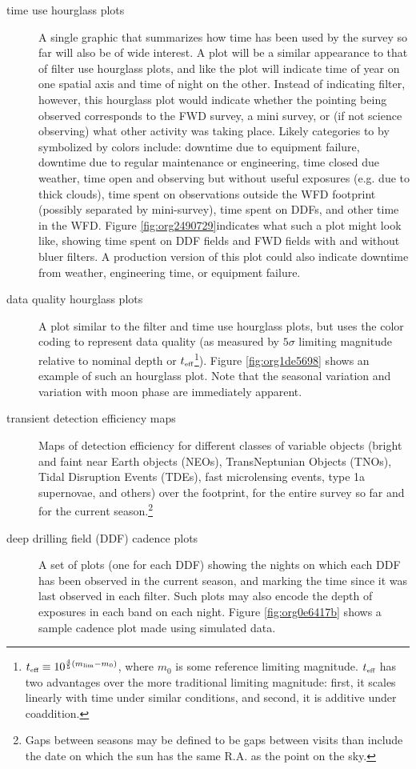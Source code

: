 \begin{description}
\item[{time use hourglass plots}] A single graphic that summarizes how time has been used by the survey so far will also be of wide interest. A plot will be a similar appearance to that of filter use hourglass plots, and like the plot will indicate time of year on one spatial axis and time of night on the other. Instead of indicating filter, however, this hourglass plot would indicate whether the pointing being observed corresponds to the FWD survey, a mini survey, or (if not science observing) what other activity was taking place. Likely categories to by symbolized by colors include: downtime due to equipment failure, downtime due to regular maintenance or engineering, time closed due weather, time open and observing but without useful exposures (e.g. due to thick clouds), time spent on observations outside the WFD footprint (possibly separated by mini-survey), time spent on DDFs, and other time in the WFD. Figure \ref{fig:org2490729}indicates what such a plot might look like, showing time spent on DDF fields and FWD fields with and without bluer filters. A production version of this plot could also indicate downtime from weather, engineering time, or equipment failure.
\item[{data quality hourglass plots}] A plot similar to the filter and time use hourglass plots, but uses the color coding to represent data quality (as measured by \(5\sigma\) limiting magnitude relative to nominal depth or \(t_{\mbox{\tiny eff}}\)\footnote{\(t_{\mbox{\tiny eff}} \equiv 10^{\frac{4}{5}(m_{\mbox{\tiny lim}} - m_{0})}\), where \(m_{0}\) is some reference limiting magnitude. \(t_{\mbox{\tiny eff}}\) has two advantages over the more traditional limiting magnitude: first, it scales linearly with time under similar conditions, and second, it is additive under coaddition.}). Figure \ref{fig:org1de5698} shows an example of such an hourglass plot. Note that the seasonal variation and variation with moon phase are immediately apparent.
\item[{transient detection efficiency maps}] Maps of detection efficiency for different classes of variable objects (bright and faint near Earth objects (NEOs), TransNeptunian Objects (TNOs), Tidal Disruption Events (TDEs), fast microlensing events, type 1a supernovae, and others) over the footprint, for the entire survey so far and for the current season.\footnote{Gaps between seasons may be defined to be gaps between visits than include the date on which the sun has the same R.A. as the point on the sky.}
\item[{deep drilling field (DDF) cadence plots}] A set of plots (one for each DDF) showing the nights on which each DDF has been observed in the current season, and marking the time since it was last observed in each filter. Such plots may also encode the depth of exposures in each band on each night. Figure \ref{fig:org0e6417b} shows a sample cadence plot made using simulated data.

\end{description}
